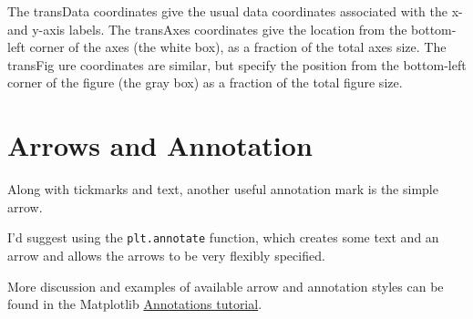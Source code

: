 
The transData coordinates give the usual data coordinates associated with the x- and
y-axis labels. The transAxes coordinates give the location from the bottom-left corner of the axes (the white box), as a fraction of the total axes size. The transFig
ure coordinates are similar, but specify the position from the bottom-left corner of
the figure (the gray box) as a fraction of the total figure size.


\section{Arrows and Annotation}
Along with tickmarks and text, another useful annotation mark is the simple arrow.

I'd suggest using the \verb|plt.annotate| function, which creates some text and an arrow and allows the arrows to be very flexibly
specified.

More discussion and examples of available arrow and annotation styles can be found
in the Matplotlib \href{https://matplotlib.org/stable/tutorials/text/annotations.html}{Annotations tutorial}.

